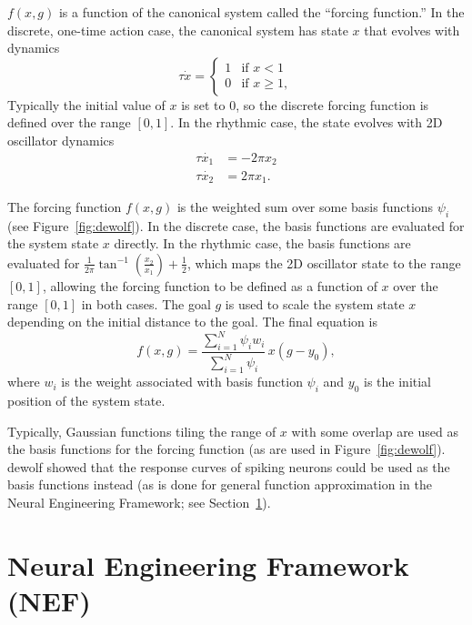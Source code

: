 {$f(x, g)$ is a function
of the canonical system
called the ``forcing function.''
In the discrete, one-time action case,
the canonical system
has state $x$ that evolves
with dynamics
\begin{equation}
  \label{dmp-discrete}
  \tau\dot{x} =
  \begin{cases}
    1 &\text{if } x < 1 \\
    0 &\text{if } x \ge 1,
  \end{cases}
\end{equation}
Typically the initial value of $x$
is set to 0,
so the discrete forcing function
is defined over the range $[0, 1]$.
In the rhythmic case,
the state evolves with
2D oscillator dynamics
\begin{align}
  \tau \dot{x_1} &= -2 \pi x_2 \nonumber \\
  \tau \dot{x_2} &= 2 \pi x_1.
  \label{dmp-rhythmic}
\end{align}


The forcing function $f(x, g)$ is
the weighted sum
over some basis functions
$\psi_i$
(see Figure~\ref{fig:dewolf}).
In the discrete case,
the basis functions are evaluated
for the system state $x$ directly.
In the rhythmic case,
the basis functions are evaluated
for $\frac{1}{2\pi}\tan^{-1}\left(\frac{x_2}{x_1}\right) + \frac{1}{2}$,
which maps the 2D oscillator state
to the range $[0, 1]$,
allowing the forcing function to be defined
as a function of $x$ over the range $[0, 1]$
in both cases.
The goal $g$ is used
to scale the system state $x$ depending on
the initial distance to the goal.
The final equation is
\begin{equation}
  \label{dmp-forcing-func}
  f(x, g) = \frac{\sum_{i=1}^N \psi_i w_i}{\sum_{i=1}^N \psi_i} \, x(g - y_0),
\end{equation}
where $w_i$ is the weight associated with
basis function $\psi_i$ and $y_0$
is the initial position of
the system state.

Typically, Gaussian functions
tiling the range of $x$ with some overlap
are used as the basis functions
for the forcing function
(as are used in Figure~\ref{fig:dewolf}).
\cite{dewolf2014} dewolf showed that
the response curves of spiking neurons
could be used as the
basis functions instead
(as is done for general function approximation
in the Neural Engineering Framework;
see Section~\ref{sec:nef}).

\section{Neural Engineering Framework (NEF)}
\label{sec:nef}

}
